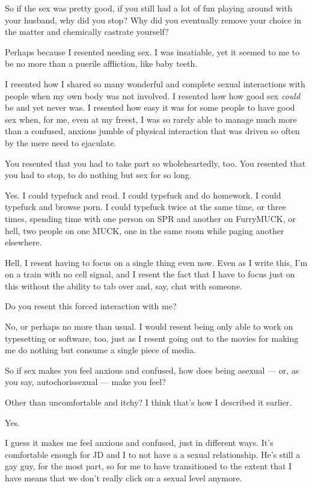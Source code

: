 \begin{paracol}{2}
\begin{leftcolumn}
\begin{ally}
So if the sex was pretty good, if you still had a lot of fun playing around with your husband, why did you stop? Why did you eventually remove your choice in the matter and chemically castrate yourself?
\end{ally}
Perhaps because I resented needing sex. I was insatiable, yet it seemed to me to be no more than a puerile affliction, like baby teeth.

I resented how I shared so many wonderful and complete sexual interactions with people when my own body was not involved. I resented how how good sex \emph{could} be and yet never was. I resented how easy it was for some people to have good sex when, for me, even at my freest, I was so rarely able to manage much more than a confused, anxious jumble of physical interaction that was driven so often by the mere need to ejaculate.

\begin{ally}
You resented that you had to take part so wholeheartedly, too. You resented that you had to stop, to do nothing but sex for so long.
\end{ally}
Yes. I could typefuck and read. I could typefuck and do homework. I could typefuck and browse porn. I could typefuck twice at the same time, or three times, spending time with one person on SPR and another on FurryMUCK, or hell, two people on one MUCK, one in the same room while paging another elsewhere.

Hell, I resent having to focus on a single thing even now. Even as I write this, I'm on a train with no cell signal, and I resent the fact that I have to focus just on this without the ability to tab over and, say, chat with someone.

\begin{ally}
Do you resent this forced interaction with me?
\end{ally}
No, or perhaps no more than usual. I would resent being only able to work on typesetting or software, too, just as I resent going out to the movies for making me do nothing but consume a single piece of media.
\newpage

\begin{ally}
So if sex makes you feel anxious and confused, how does being asexual --- or, as you say, autochorissexual --- make you feel?
\end{ally}
Other than uncomfortable and itchy? I think that's how I described it earlier.

\begin{ally}
Yes.
\end{ally}
I guess it makes me feel anxious and confused, just in different ways. It's comfortable enough for JD and I to not have a a sexual relationship. He's still a gay guy, for the most part, so for me to have transitioned to the extent that I have means that we don't really click on a sexual level anymore.


\end{leftcolumn}
\end{paracol}
